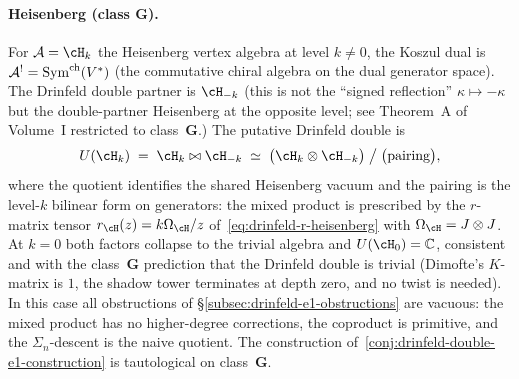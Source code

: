 \paragraph{Heisenberg (class $\mathbf{G}$).}
For $\cA = \cH_k$ the Heisenberg vertex algebra at level
$k\ne 0$, the Koszul dual is $\mathcal{A}^! = \mathrm{Sym}^{\mathrm{ch}}(V^*)$ (the commutative chiral
algebra on the dual generator space). The Drinfeld double partner is $\cH_{-k}$ (this is not the ``signed
reflection'' $\kappa\mapsto-\kappa$ but the
double-partner Heisenberg at the opposite level; see
Theorem~A of Volume~I restricted to class~$\mathbf{G}$.)
The putative Drinfeld double is
\[
U(\cH_k)
\;=\;
\cH_k \bowtie \cH_{-k}
\;\simeq\;
\bigl(\cH_k \otimes \cH_{-k}\bigr) \;\big/\;
\bigl(\text{pairing}\bigr),
\]
where the quotient identifies the shared Heisenberg
vacuum and the pairing is the level-$k$ bilinear form
on generators: the mixed product is prescribed by the
$r$-matrix tensor $r_{\cH}(z)=k\Omega_{\cH}/z$ of~\eqref{eq:drinfeld-r-heisenberg}
with $\Omega_{\cH}=J\otimes J$.
At $k = 0$ both factors collapse to the trivial algebra
and $U(\cH_0) = \mathbb{C}$, consistent and
with the class~$\mathbf{G}$ prediction that the Drinfeld
double is trivial (Dimofte's $K$-matrix is $1$, the
shadow tower terminates at depth zero, and no twist is
needed). In this case all obstructions of
\S\ref{subsec:drinfeld-e1-obstructions} are vacuous: the
mixed product has no higher-degree corrections, the
coproduct is primitive, and the $\Sigma_n$-descent is the
naive quotient. The construction
of~\eqref{conj:drinfeld-double-e1-construction} is
tautological on class~$\mathbf{G}$.

